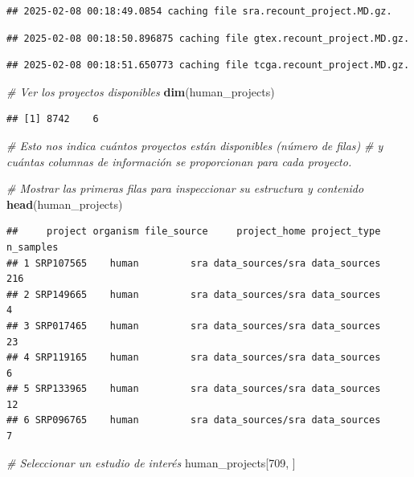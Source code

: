 \documentclass[
]{article}
\newenvironment{Shaded}{\begin{snugshade}}{\end{snugshade}}
\newcommand{\CommentTok}[1]{\textcolor[rgb]{0.56,0.35,0.01}{\textit{#1}}}
\newcommand{\DecValTok}[1]{\textcolor[rgb]{0.00,0.00,0.81}{#1}}
\newcommand{\FunctionTok}[1]{\textcolor[rgb]{0.13,0.29,0.53}{\textbf{#1}}}
\newcommand{\NormalTok}[1]{#1}
\begin{document}
\begin{verbatim}
## 2025-02-08 00:18:49.0854 caching file sra.recount_project.MD.gz.
\end{verbatim}

\begin{verbatim}
## 2025-02-08 00:18:50.896875 caching file gtex.recount_project.MD.gz.
\end{verbatim}

\begin{verbatim}
## 2025-02-08 00:18:51.650773 caching file tcga.recount_project.MD.gz.
\end{verbatim}

\begin{Shaded}
\begin{Highlighting}[]
\CommentTok{\# Ver los proyectos disponibles}
\FunctionTok{dim}\NormalTok{(human\_projects)}
\end{Highlighting}
\end{Shaded}

\begin{verbatim}
## [1] 8742    6
\end{verbatim}

\begin{Shaded}
\begin{Highlighting}[]
\CommentTok{\# Esto nos indica cuántos proyectos están disponibles (número de filas) }
\CommentTok{\# y cuántas columnas de información se proporcionan para cada proyecto.}

\CommentTok{\# Mostrar las primeras filas para inspeccionar su estructura y contenido}
\FunctionTok{head}\NormalTok{(human\_projects)}
\end{Highlighting}
\end{Shaded}

\begin{verbatim}
##     project organism file_source     project_home project_type n_samples
## 1 SRP107565    human         sra data_sources/sra data_sources       216
## 2 SRP149665    human         sra data_sources/sra data_sources         4
## 3 SRP017465    human         sra data_sources/sra data_sources        23
## 4 SRP119165    human         sra data_sources/sra data_sources         6
## 5 SRP133965    human         sra data_sources/sra data_sources        12
## 6 SRP096765    human         sra data_sources/sra data_sources         7
\end{verbatim}

\begin{Shaded}
\begin{Highlighting}[]
\CommentTok{\# Seleccionar un estudio de interés}
\NormalTok{human\_projects[}\DecValTok{709}\NormalTok{, ]}
\end{Highlighting}
\end{Shaded}
\end{document}

